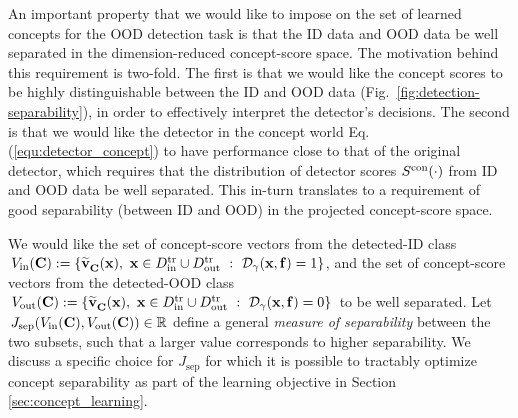 An important property that we would like to impose on the set of learned concepts for the OOD detection task is that the ID data and OOD data be well separated in the dimension-reduced concept-score space.
The motivation behind this requirement is two-fold.
The first is that we would like the concept scores to be highly distinguishable between the ID and OOD data (\eg Fig.~\ref{fig:detection-separability}), in order to effectively interpret the detector's decisions.
The second is that we would like the detector in the concept world Eq. (\ref{equ:detector_concept}) to have performance close to that of the original detector, which requires that the distribution of detector scores $S^{\textrm{con}}(\cdot)$ from ID and OOD data be well separated.
This in-turn translates to a requirement of good separability (between ID and OOD) in the projected concept-score space.

\fi

We would like the set of concept-score vectors from the detected-ID class $\,V_{\textrm{in}}(\mathbf{C}) := \{\widetilde{\mathbf{v}}^{}_{\mathbf{C}}(\mathbf{x}), ~\mathbf{x} \in D_{\textrm{in}}^{\textrm{tr}} \cup D_{\textrm{out}}^{\textrm{tr}} ~:~ \mathcal{D}_\gamma(\mathbf{x}, \mathbf{f}) = 1\}$, and the set of concept-score vectors from the detected-OOD class $\,V_{\textrm{out}}(\mathbf{C}) := \{\widetilde{\mathbf{v}}^{}_{\mathbf{C}}(\mathbf{x}), ~\mathbf{x} \in D_{\textrm{in}}^{\textrm{tr}} \cup D_{\textrm{out}}^{\textrm{tr}} ~:~ \mathcal{D}_\gamma(\mathbf{x}, \mathbf{f}) = 0\}\,$ to be well separated.
Let $\,J_{\textrm{sep}}(V_{\textrm{in}}(\mathbf{C}), V_{\textrm{out}}(\mathbf{C})) \in \mathbb{R}$ define a general {\it measure of separability} between the two subsets, such that a larger value corresponds to higher separability. We discuss a specific choice for $J_{\textrm{sep}}$ for which it is possible to tractably optimize concept separability as part of the learning objective in Section \ref{sec:concept_learning}.



